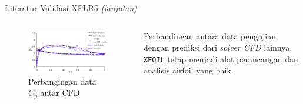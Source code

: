 \begin{frame}{Literatur Validasi XFLR5 \textit{(lanjutan)}}
  \begin{columns}[t]
    \begin{column}{.5\linewidth}
      \begin{figure}[h]
        \centering
        \includegraphics[width=0.8\linewidth]{statics/compar_airfoil3}
        \caption{Perbangingan data $C_p$ antar CFD}
        \label{fig:comparairfoil3}
      \end{figure}
    \end{column}

    \begin{column}{.5\linewidth}
      \begin{block}{}
        \cite{morgado2016xfoil} Perbandingan antara data pengujian dengan prediksi dari \textit{solver CFD} lainnya, \texttt{XFOIL} tetap menjadi alat perancangan dan analisis airfoil yang baik.
      \end{block}
    \end{column}
  \end{columns}
\end{frame}
